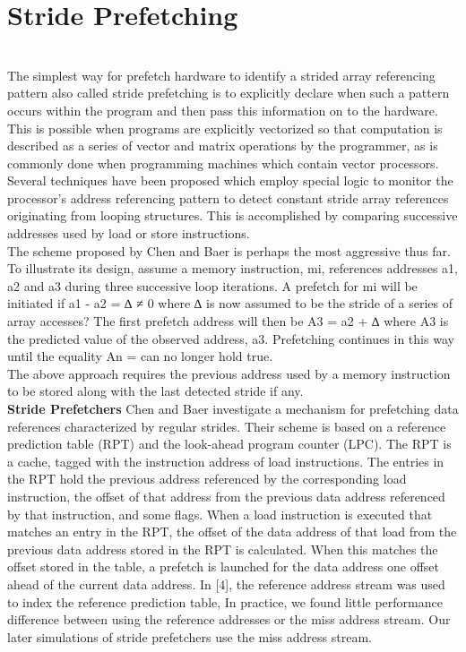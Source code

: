 \documentclass{article}
\begin{document}
\section{Stride Prefetching}
\\The simplest way for prefetch hardware to identify a strided array referencing pattern also called stride prefetching is to explicitly declare when such a pattern occurs within the program and then pass this information on to the hardware. This is possible when programs are explicitly vectorized so that computation is described as a series of vector and matrix operations by the programmer, as is commonly done when programming machines which contain vector processors.
\\Several techniques have been proposed which employ special logic to monitor the processor’s address referencing pattern to detect constant stride array references originating from looping structures. This is accomplished by comparing successive addresses used by load or store instructions.
\\The scheme proposed by Chen and Baer is perhaps the most aggressive thus far. To illustrate its design, assume a memory instruction, mi, references addresses a1, a2 and a3 during three successive loop iterations. A prefetch for mi will be initiated if                                   a1 - a2  = ∆ ≠ 0 
where ∆ is now assumed to be the stride of a series of array accesses? The first prefetch address will then be A3 = a2 + ∆ where A3 is the predicted value of the observed address, a3. Prefetching continues in this way until the equality An = can no longer hold true.
\\The above approach requires the previous address used by a memory instruction to be stored along with the last detected stride if any. 
\\\textbf{Stride Prefetchers} Chen and Baer investigate a mechanism for prefetching data references characterized by regular strides. Their scheme is based on a reference prediction table (RPT) and the look-ahead program counter (LPC). The RPT is a cache, tagged with the instruction address of load instructions. The entries in the RPT hold the previous address referenced by the corresponding load instruction, the offset of that address from the previous data address referenced by that instruction, and some flags. When a load instruction is executed that matches an entry in the RPT, the offset of the data address of that load from the previous data address stored in the RPT is calculated. When this matches the offset stored in the table, a prefetch is launched for the data address one offset ahead of the current data address. In [4], the reference address stream was used to index the reference prediction table, In practice, we found little performance difference between using the reference addresses or the miss address stream. Our later simulations of stride prefetchers use the miss address stream. 
\end{document}
